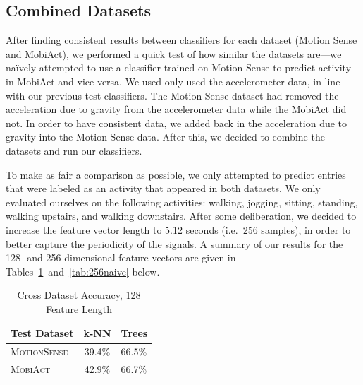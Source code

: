 \subsection{Combined Datasets}
\label{sub:dataset_cross_val}

After finding consistent results between classifiers for each dataset (Motion Sense and MobiAct), we performed a quick test of how similar the datasets are---we na\"ively attempted to use a classifier trained on Motion Sense to predict activity in MobiAct and vice versa. We used only used the accelerometer data, in line with our previous test classifiers. The Motion Sense dataset had removed the acceleration due to gravity from the accelerometer data while the MobiAct did not. In order to have consistent data, we added back in the acceleration due to gravity into the Motion Sense data. After this, we decided to combine the datasets and run our classifiers. 

To make as fair a comparison as possible, we only attempted to predict entries that were labeled as an activity that appeared in both datasets. We only evaluated ourselves on the following activities: walking, jogging, sitting, standing, walking upstairs, and walking downstairs. After some deliberation, we decided to increase the feature vector length to 5.12 seconds (i.e.\ 256 samples), in order to better capture the periodicity of the signals. A summary of our results for the 128- and 256-dimensional feature vectors are given in Tables~\ref{tab:128naive}~and~\ref{tab:256naive} below.


\begin{table}[H]
\centering
\caption{Cross Dataset Accuracy, 128 Feature Length}
\begin{tabular}{lcl}
\toprule
\multicolumn{1}{l}{\textbf{Test Dataset}} & \multicolumn{1}{c}{\textbf{k-NN}} & \multicolumn{1}{c}{\textbf{Trees}}  \\ \midrule
\textsc{MotionSense} & 39.4\% & 66.5\%  \\
\textsc{MobiAct}     & 42.9\% & 66.7\%  \\
\bottomrule
\end{tabular}
\label{tab:128naive}
\end{table}




